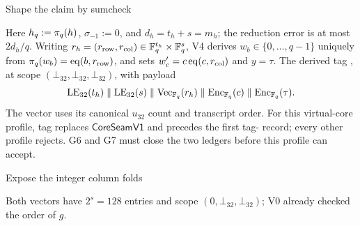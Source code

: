\begin{pvstep}[2.8in]{Shape the claim by sumcheck}{%
}
\begin{pvexchange}
\end{pvexchange}
Here $h_q:=\pi_q(h)$, $\sigma_{-1}:=0$, and $d_h=t_h+s=m_h$; the reduction
error is at most $2d_h/q$.
Writing $r_h=(r_{\rm row},r_{\rm col})\in\mathbb F_q^{t_h}\times\mathbb F_q^s$, V4 derives
$w_b\in\{0,\ldots,q-1\}$ uniquely from
$\pi_q(w_b)=\operatorname{eq}(b,r_{\rm row})$, and sets
$w'_c=c\operatorname{eq}(c,r_{\rm col})$ and $y=\tau$.
The derived tag , at scope
$(\bot_{32},\bot_{32},\bot_{32})$, with
payload
\begin{equation}
 \operatorname{LE}_{32}(t_h)\parallel
 \operatorname{LE}_{32}(s)\parallel
 \operatorname{Vec}_{\mathbb F_q}(r_h)\parallel
 \operatorname{Enc}_{\mathbb F_q}(c)\parallel
 \operatorname{Enc}_{\mathbb F_q}(\tau).
 \label{eq:sha-virtual-seam}
\end{equation}
The vector uses its canonical $u_{32}$ count and transcript order.  For this
virtual-core profile, tag  replaces $\mathsf{CoreSeamV1}$ and precedes
the first tag- record; every other profile rejects.  G6 and G7
must close the two ledgers before this profile can accept.
\end{pvstep}

\begin{pvstep}[2.4in]{Expose the integer column folds}{%
}
\begin{pvexchange}
\Psend{\Nbadge{\nu}}
\end{pvexchange}
Both vectors have $2^s=128$ entries and scope
$(0,\bot_{32},\bot_{32})$; V0 already checked the order of $g$.
\end{pvstep}

